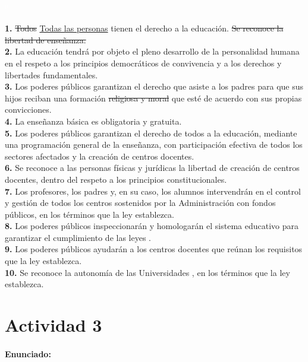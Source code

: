 \textcolor{white}{a}\\\\
\textbf{1.
} \sout{Todos} \ul{Todas las personas} tienen el derecho a la educación.
 \sout{Se reconoce la libertad de enseñanza.
}\\
\textbf{2.
} La educación tendrá por objeto el pleno desarrollo de la personalidad humana en el respeto a los principios democráticos de convivencia y a los derechos y libertades fundamentales.
 \\
\textbf{3.
} Los poderes públicos garantizan el derecho que asiste a los padres para que sus hijos reciban una formación \sout{religiosa y moral} que esté de acuerdo con sus propias convicciones.
 \\
\textbf{4.
} La enseñanza básica es obligatoria y gratuita.
\\
\textbf{5.
} Los poderes públicos garantizan el derecho de todos a la educación, mediante una programación general de la enseñanza, con participación efectiva de todos los sectores afectados y la creación de centros docentes.
 \\
\textbf{6.
} Se reconoce a las personas físicas y jurídicas la libertad de creación de centros docentes, dentro del respeto a los principios constitucionales.
 \\
\textbf{7.
} Los profesores, los padres y, en su caso, los alumnos intervendrán en el control y gestión de todos los centros sostenidos por la Administración con fondos públicos, en los términos que la ley establezca.
\\
\textbf{8.
} Los poderes públicos inspeccionarán y homologarán el sistema educativo para garantizar el cumplimiento de las leyes .
 \\
\textbf{9.
} Los poderes públicos ayudarán a los centros docentes que reúnan los requisitos que la ley establezca.
\\
\textbf{10.
} Se reconoce la autonomía de las Universidades , en los términos que la ley establezca.
\\


\newpage
\section*{Actividad 3}
\paragraph{Enunciado: }

